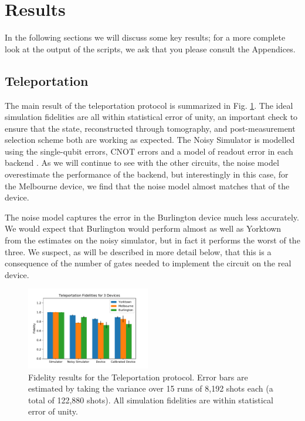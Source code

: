 \section{Results} In the following sections we will discuss some key results;
for a more complete look at the output of the scripts, we ask that you please
consult the Appendices.

\subsection{Teleportation} The main result of the teleportation protocol is
summarized in Fig. \ref{fig:teleport_histogram}. The ideal simulation fidelities
are all within statistical error of unity, an important check to ensure that the
state, reconstructed through tomography, and post-measurement selection scheme
both are working as expected. The Noisy Simulator is modelled using the
single-qubit errors, CNOT errors and a model of readout error in each backend
\cite{qiskit_org}. As we will continue to see with the other circuits, the noise
model overestimate the performance of the backend, but interestingly in this
case, for the Melbourne device, we find that the noise model almost matches that
of the device.

The noise model captures the error in the Burlington device much less
accurately. We would expect that Burlington would perform almost as well as
Yorktown from the estimates on the noisy simulator, but in fact it performs the
worst of the three. We suspect, as will be described in more detail below, that
this is a consequence of the number of gates needed to implement the circuit on
the real device.

\begin{figure}[h] \centering
	\includegraphics[width=0.48\textwidth]{images/results/teleport_histogram.pdf}
	\caption{Fidelity results for the Teleportation protocol. Error bars are
		estimated by taking the variance over 15 runs of 8,192 shots each (a total of
		122,880 shots). All simulation fidelities are within statistical error of
		unity.}
	\label{fig:teleport_histogram}
\end{figure}

